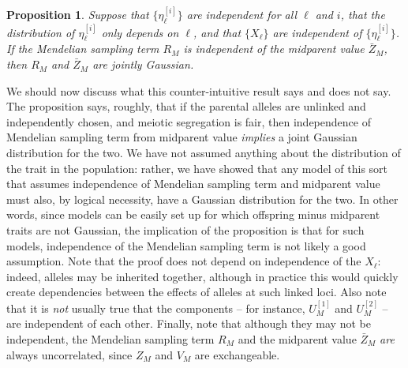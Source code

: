 \documentclass{article}
\newcommand{\1}{\mathbbm{1}}
\newtheorem{prop}{Proposition}
\theoremstyle{remark}
\theoremstyle{definition}
\begin{document}
\begin{prop}\label{prop:parental_contribs}
    Suppose that $\{\eta_\ell^{[i]}\}$ are independent for all $\ell$ and $i$,
    that the distribution of $\eta_\ell^{[i]}$ only depends on $\ell$,
    and that $\{X_\ell\}$ are independent of $\{\eta_\ell^{[i]}\}$.
    If the Mendelian sampling term $R_M$ is independent of the midparent value $\bar Z_M$,
    then $R_M$ and $\bar Z_M$ are jointly Gaussian.
\end{prop}

We should now discuss what this counter-intuitive result says and does not say.
The proposition says, roughly, that if the parental alleles are unlinked and independently chosen,
and meiotic segregation is fair,
then independence of Mendelian sampling term from midparent value
\emph{implies} a joint Gaussian distribution for the two.
We have not assumed anything about the distribution of the trait in the population:
rather, we have showed that any model of this sort
that assumes independence of Mendelian sampling term and midparent value
must also, by logical necessity, have a Gaussian distribution for the two.
In other words, 
since models can be easily set up for which offspring minus midparent traits
are not Gaussian,
the implication of the proposition
is that for such models, independence of the Mendelian sampling term
is not likely a good assumption.
Note that the proof does not depend on independence of the $X_\ell$:
indeed, alleles may be inherited together,
although in practice this would quickly create dependencies between the effects
of alleles at such linked loci. 
Also note that it is \emph{not} usually true that the components --
for instance, $U_M^{[1]}$ and $U_M^{[2]}$ --
are independent of each other.
Finally, note that although they may not be independent,
the Mendelian sampling term $R_M$ and the midparent value $\bar Z_M$
\emph{are} always uncorrelated, since $Z_M$ and $V_M$ are exchangeable.
\end{document}
